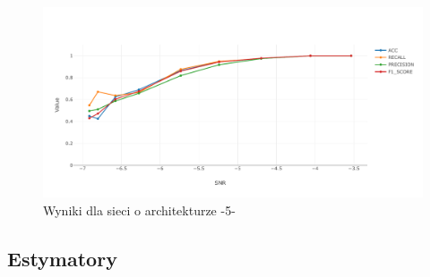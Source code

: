 \documentclass[12pt, a4paper, oneside]{article}
\begin{document}
	\begin{figure}[H]
		\includegraphics[width=16cm]{images/nn_small_5.pdf}
		\caption{Wyniki dla sieci o architekturze -5-}
	\end{figure}


	
	

	\subsection{Estymatory}
	
\end{document}
